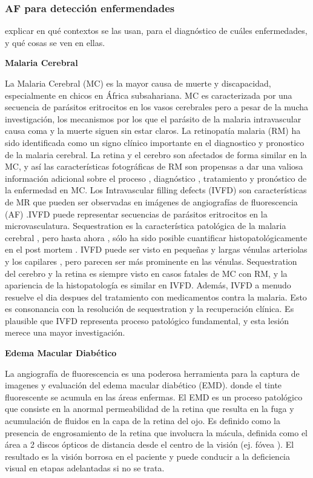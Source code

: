 \subsubsection{AF para detección enfermendades }

explicar en qué contextos se las usan, para el diagnóstico de cuáles enfermedades, y qué cosas se ven en ellas.

\textbf{Malaria Cerebral}

La Malaria Cerebral (MC) es la mayor causa de muerte y discapacidad, especialmente en chicos en África subsahariana. MC es caracterizada por una secuencia de parásitos eritrocitos
en los vasos cerebrales pero a pesar de la mucha  investigación, los mecanismos por los que el parásito de la malaria intravascular causa coma y la muerte siguen sin estar claros.
La retinopatía  malaria (RM) ha sido identificada como un signo clínico importante en el diagnostico y pronostico de la malaria cerebral. La retina y el cerebro son afectados de forma similar en la MC, y así las características fotográficas de RM son propensas a dar una valiosa información adicional sobre el proceso , diagnóstico , tratamiento y pronóstico de la enfermedad en MC.
Los Intravascular filling defects (IVFD) son características de  MR que pueden ser observadas en imágenes de  angiografías de fluorescencia (AF) .IVFD puede representar secuencias de parásitos eritrocitos en la microvasculatura. Sequestration es la característica patológica de la malaria cerebral , pero hasta ahora , sólo ha sido posible cuantificar histopatológicamente en el post mortem . IVFD puede ser visto en pequeñas y largas vénulas arteriolas y los capilares , pero parecen ser más prominente en las vénulas. Sequestration del cerebro y la retina es siempre visto en casos fatales de MC con RM, y la apariencia de la histopatología es similar en IVFD. Además, IVFD a menudo resuelve el dia despues del tratamiento con medicamentos contra la malaria. Esto es consonancia con  la resolución de sequestration y la recuperación clínica. Es plausible que  IVFD representa proceso patológico fundamental, y esta lesión merece una mayor investigación. \cite{zhao2015automated}

\textbf{Edema Macular Diabético}

La angiografía de fluorescencia es una poderosa herramienta para la captura de imagenes y evaluación del edema macular diabético (EMD). donde el tinte fluorescente se acumula en las áreas enfermas. 
El EMD es un proceso patológico que consiste en la anormal permeabilidad de la retina que resulta en la fuga y acumulación de fluidos en la capa de la retina del ojo. Es definido como la presencia de engrosamiento de la retina que involucra la mácula, definida como el área a 2 discos ópticos de distancia desde el centro de la visión (ej. fóvea ). El resultado es la visión borrosa en el paciente y puede conducir a la deficiencia visual en etapas adelantadas si no se trata. \cite{el2011segmentation} 

